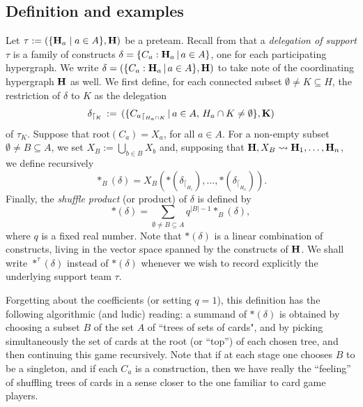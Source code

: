 \documentclass{article}
\theoremstyle{plain}
\theoremstyle{definition}
\newcommand{\set}[1]{\{#1\}}
\newcommand{\setc}[2]{\set{#1 \mid #2}}
\newcommand{\hyper}[1]{{\bf #1}}
\begin{document}
\subsection{Definition and examples}
 \label{shuffle-definition-section}
Let $\tau:=(\setc{\hyper{H}_a}{a\in A},\hyper{H})$ be a preteam. Recall from \cite{PLBJ1} that a {\it delegation of support} $\tau$ is a family of constructs $\delta=\{C_a:{\bf H}_a\,|\, a\in A\}$, one for each participating hypergraph. We write $\delta = (\{C_a:{\bf H}_a\,|\, a\in A\},{\bf H})$ to take note of the coordinating hypergraph ${\bf H}$ as well.
We first define, for each connected subset $\emptyset\neq K\subseteq H$, the restriction of $\delta$ to $K$ as the delegation $$\delta_{\lceil_{K}}\, :=\, (\{{C_a}_{\lceil_{H_a\cap K}}\,|\, a\in A,\, H_a\cap K\neq \emptyset\},{\bf K})$$ of $\tau_K$. Suppose that
$\mbox{root}(C_a)=X_a$, for all $a\in A$. For a non-empty subset $\emptyset\neq B\subseteq A$, we set $X_B:=\bigcup_{b\in B}X_b$ and, supposing that ${\bf H},X_B\leadsto {\bf H}_1,\dots,{\bf H}_n$, we define recursively
$$\ast_B(\delta)=X_B(\ast(\delta_{\lceil_{H_1}}),\ldots,\ast(\delta_{\lceil_{H_n}})).$$ Finally, the  {\it   shuffle product}  (or   product) of   $\delta$ is  defined by
\begin{equation} \label{shuffle-antistrict-def} 
\ast(\delta)= \sum_{\emptyset\neq B\subseteq A} q^{{|B|}-1}\ast_B(\delta),
\end{equation}
where $q$ is a fixed real number.  Note that $\ast(\delta)$ is a linear combination of constructs, living in the vector space spanned by the constructs of $\hyper{H}$. We shall  write $\ast^{\tau}(\delta)$ instead of $\ast(\delta)$ whenever we wish to record explicitly the underlying support team 
$\tau$.

\smallskip

Forgetting about the coefficients (or setting $q=1$), this definition has the following algorithmic (and ludic) reading: a summand of $\ast(\delta)$ is obtained by  choosing a subset $B$ of the set $A$ of ``trees of sets of cards", and by picking simultaneously the set of cards  at the root (or ``top'') of each chosen tree, and then continuing this game recursively.  Note that if at each stage one chooses $B$ to be a singleton, and if each $C_a$ is a construction, then we have really the ``feeling'' of shuffling trees of cards in a sense closer to the one familiar to card game players.
\end{document}
